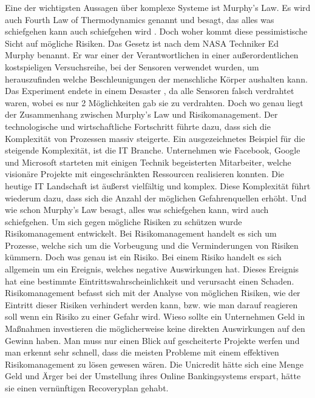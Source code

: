 \documentclass{report}
\begin{document}
Eine der wichtigsten Aussagen über komplexe Systeme ist Murphy's Law. Es wird auch Fourth Law of Thermodynamics genannt und besagt, das alles was schiefgehen kann auch schiefgehen wird . Doch woher kommt diese pessimistische Sicht auf mögliche Risiken. Das Gesetz ist nach dem NASA Techniker Ed Murphy benannt. Er war einer der Verantwortlichen in einer außerordentlichen kostspieligen Versuchsreihe, bei der Sensoren verwendet wurden, um herauszufinden welche Beschleunigungen der menschliche Körper aushalten kann.  Das Experiment endete in einem Desaster , da alle Sensoren falsch verdrahtet waren, wobei es nur 2 Möglichkeiten gab sie zu verdrahten. 
\newline
\newline
Doch wo genau liegt der Zusammenhang zwischen Murphy's Law und Risikomanagement. Der technologische und wirtschaftliche Fortschritt führte dazu, dass  sich die Komplexität von Prozessen massiv steigerte. Ein ausgezeichnetes Beispiel für die steigende Komplexität, ist die IT Branche. Unternehmen wie Facebook, Google und Microsoft starteten mit einigen Technik begeisterten Mitarbeiter, welche visionäre Projekte mit eingeschränkten Ressourcen realisieren konnten. Die heutige IT Landschaft ist äußerst vielfältig und komplex. Diese Komplexität führt wiederum dazu, dass sich die Anzahl der möglichen Gefahrenquellen erhöht. Und wie schon Murphy's Law besagt, alles was schiefgehen kann, wird auch schiefgehen. 
\newline
\newline
Um sich gegen mögliche Risiken zu schützen wurde Risikomanagement entwickelt. Bei Risikomanagement handelt es sich um Prozesse, welche sich um die Vorbeugung und die Verminderungen von Risiken kümmern. Doch was genau ist ein Risiko\cite{WikiR}. Bei einem Risiko handelt es sich allgemein um ein Ereignis, welches negative Auswirkungen hat. Dieses Ereignis hat eine bestimmte Eintrittswahrscheinlichkeit und verursacht einen Schaden.  Risikomanagement befasst sich mit der Analyse von möglichen Risiken, wie der Eintritt dieser Risiken verhindert werden kann, bzw. wie man darauf reagieren soll wenn ein Risiko zu einer Gefahr wird.  
\newline
\newline
Wieso sollte ein Unternehmen Geld in Maßnahmen investieren die möglicherweise keine direkten Auswirkungen auf den Gewinn haben. Man muss nur einen Blick auf gescheiterte Projekte werfen und man erkennt sehr schnell, dass die meisten Probleme mit einem effektiven Risikomanagement zu lösen gewesen wären. Die Unicredit hätte sich eine Menge Geld und Ärger bei der Umstellung ihres Online Bankingsystems erspart, hätte sie einen vernünftigen Recoveryplan gehabt.     
\end{document}
